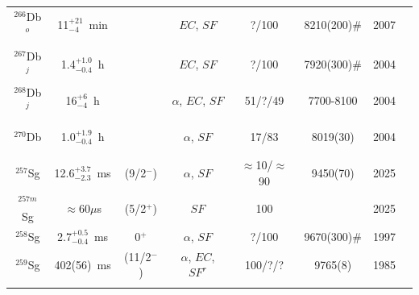 \begin{center}
\begin{longtable}{c|ccccccl}
$^{266}$Db$^o$&11$^{+21}_{-4}$~min& 	&$EC$, $SF$			&?/100		&8210(200)$\#$      &2007	&{\tiny\cite{Oganessian2007b,Oganessian2007,Oganessian2007a,Oganessian2011a,Oganessian2013,Oganessian2015}}\\
			&				&			&					&			& 				    &		&{\tiny\cite{Oganessian2017,Oganessian2022c,Oganessian2022d}}\\
$^{267}$Db$^j$& 1.4$^{+1.0}_{-0.4}$~h& 	&$EC$, $SF$			&?/100		&7920(300)$\#$	    &2004	&{\tiny\cite{Oganessian2003,Oganessian2004b,Oganessian2007,Oganessian2011a,Oganessian2022d}}\\
$^{268}$Db$^j$& 16$^{+6}_{-4}$~h& 		&$\alpha$, $EC$, $SF$&51/?/49	&7700-8100		    &2004	&{\tiny\cite{Oganessian2003,Oganessian2004b,Dmitriev2005,Oganessian2005,Oganessian2007,StoyerN2007}}\\
			&				&			&					&			& 				    &		&{\tiny\cite{Oganessian2011a,Oganessian2012,Oganessian2013,Rudolph2013,Gates2015,Oganessian2015}}\\
			&				&			&					&			& 				    &		&{\tiny\cite{Rudolph2015,Forsberg2016,Oganessian2017,Oganessian2022c,Oganessian2022d,Kuznetsova2023}}\\
$^{270}$Db	& 1.0$^{+1.9}_{-0.4}$~h& 	&$\alpha$, $SF$		&17/83		&8019(30)           &2004	&{\tiny\cite{Oganessian2003,Oganessian2004b,Dmitriev2005,Oganessian2005,Oganessian2007,StoyerN2007}}\\
			&				&			&					&			& 				    &		&{\tiny\cite{Oganessian2012,Oganessian2011a,Khuyagbaatar2014,Khuyagbaatar2019}}\\
\hline\\
$^{257}$Sg	&12.6$^{+3.7}_{-2.3}$~ms&(9/2$^-$)&$\alpha$, $SF$&$\approx$10/$\approx$90&9450(70)&2025&{\tiny\cite{Mosat2025}}\\
$^{257m}$Sg	&$\approx60\mu$s&(5/2$^+$)  &$SF$               &100	    &	                &2025	&{\tiny\cite{Mosat2025}}\\
$^{258}$Sg	& 2.7$^{+0.5}_{-0.4}$~ms& 0$^+$&$\alpha$, $SF$	&?/100	    &9670(300)\#        &1997	&{\tiny\cite{Hessberger1997,Hessberger1999,Folden2009,Mosat2025}}\\
$^{259}$Sg	& 402(56)~ms	& (11/2$^-$)&$\alpha$, $EC$, $SF^r$&100/?/? &9765(8)		    &1985	&{\tiny\cite{Oganessian1974,Demin1984,Muenzenberg1985,Holden2000,Folden2009,Hessberger2009}}\\
			&				&			&					&			& 				    &		&{\tiny\cite{Antalic2013,Antalic2015,Mosat2025}}\\

\end{longtable}
\end{center}

